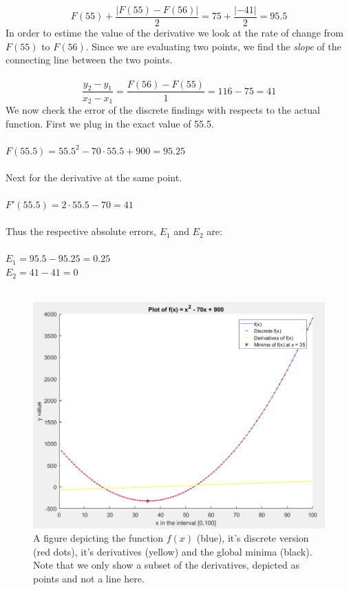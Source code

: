 \documentclass[]{article}
\begin{document}
\begin{equation}
	F(55) + \frac{ |F(55) - F(56)| } {2} = 75 + \frac{ | -41 | } {2} = 95.5 
\end{equation}
In order to estime the value of the derivative we look at the rate of change from $F(55)$ to $F(56)$. Since we are evaluating two points, we find the \textit{slope} of the connecting line between the two points.\\\\
\begin{equation}
\frac{y_2 - y_1} {x_2-x_1} = \frac{ F(56) - F(55)} {1} = 116 - 75 = 41
\end{equation}
We now check the error of the discrete findings with respects to the actual function. First we plug in the exact value of 55.5.\\\\
$F(55.5) = 55.5^2 - 70 \cdot 55.5 + 900 = 95.25$\\\\
Next for the derivative at the same point.\\\\
$F'(55.5) = 2 \cdot 55.5 - 70 = 41$\\\\
Thus the respective absolute errors, $E_1$ and $E_2$ are:\\\\
$E_1 = 95.5 - 95.25 = 0.25$\\
$E_2 = 41 - 41 = 0$\\\\

\begin{figure}[H]
\centering
\includegraphics[scale=0.75]{task1.PNG}
\caption{A figure depicting the function $f(x)$ (blue), it's discrete version (red dots), it's derivatives (yellow) and the global minima (black). Note that we only show a subset of the derivatives, depicted as points and not a line here.}
\label{fig:fx}
\end{figure}
\end{document}

